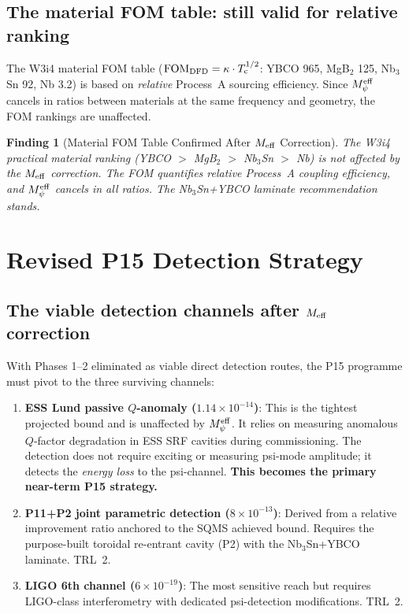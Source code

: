 \documentclass[11pt]{article}
\newtheorem{finding}{Finding}
\newcommand{\ee}[1]{\times 10^{#1}}
\newcommand{\Meff}{M_\psi^{\rm eff}}
\newcommand{\FOM}{\mathrm{FOM}}
\newcommand{\Tc}{T_{\rm c}}
\begin{document}
\subsection{The material FOM table: still valid for relative ranking}

The W3i4 material FOM table ($\FOM_{\rm DFD} = \kappa\cdot\Tc^{1/2}$:
YBCO 965, MgB$_2$ 125, Nb$_3$Sn 92, Nb 3.2) is based on \emph{relative}
Process~A sourcing efficiency. Since $\Meff$ cancels in ratios between
materials at the same frequency and geometry, the FOM rankings are unaffected.

\begin{finding}[Material FOM Table Confirmed After $M_{\rm eff}$ Correction]
\label{find:FOM-valid}
The W3i4 practical material ranking (YBCO $>$ MgB$_2$ $>$ Nb$_3$Sn $>$ Nb)
is \emph{not affected} by the $M_{\rm eff}$ correction. The FOM quantifies
relative Process~A coupling efficiency, and $\Meff$ cancels in all ratios.
The Nb$_3$Sn+YBCO laminate recommendation stands.
\end{finding}

\section{Revised P15 Detection Strategy}
\label{sec:P15-strategy}

\subsection{The viable detection channels after $M_{\rm eff}$ correction}

With Phases 1--2 eliminated as viable direct detection routes, the P15
programme must pivot to the three surviving channels:

\begin{enumerate}
\item \textbf{ESS Lund passive $Q$-anomaly ($1.14\ee{-14}$)}: This is
  the tightest projected bound and is unaffected by $\Meff$. It relies on
  measuring anomalous $Q$-factor degradation in ESS SRF cavities during
  commissioning. The detection does not require exciting or measuring
  psi-mode amplitude; it detects the \emph{energy loss} to the psi-channel.
  \textbf{This becomes the primary near-term P15 strategy.}

\item \textbf{P11+P2 joint parametric detection ($8\ee{-13}$)}: Derived
  from a relative improvement ratio anchored to the SQMS achieved bound.
  Requires the purpose-built toroidal re-entrant cavity (P2) with the
  Nb$_3$Sn+YBCO laminate. TRL~2.

\item \textbf{LIGO 6th channel ($6\ee{-19}$)}: The most sensitive reach
  but requires LIGO-class interferometry with dedicated psi-detection
  modifications. TRL~2.
\end{enumerate}
\end{document}
